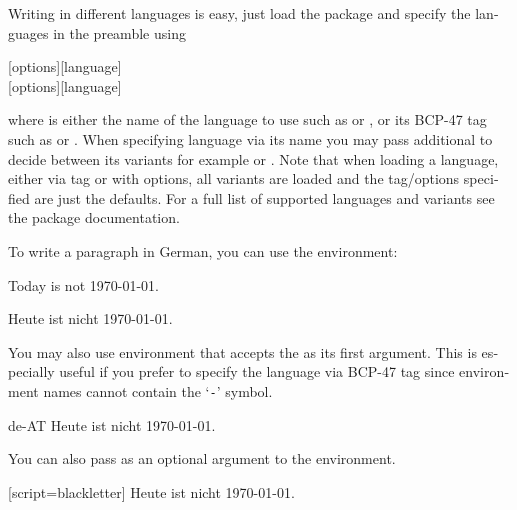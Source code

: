 Writing in different languages is easy, just load the  package
and specify the languages in the preamble using
\begin{lscommand}
  [options][language] \\
  [options][language]
\end{lscommand}
where  is either the name of the language to use such as
 or , or its BCP-47 tag such as  or
. When specifying language via its name you may pass
additional  to decide between its variants for example
 or . Note that when loading a
language, either via tag or with options, all variants are loaded and the
tag\slash options specified are just the defaults. For a full list of supported
languages and variants see the  package documentation.

To write a paragraph in German, you can use the  environment:

\begin{example}
\setdefaultlanguage{english}
Today is not \today.

\begin{german}
  Heute ist nicht \today.
\end{german}
\end{example}

You may also use  environment that accepts the  as its
first argument. This is especially useful if you prefer to specify the language
via BCP-47 tag since environment names cannot contain the
\enquote*{\texttt{-}} symbol.

\begin{example}
\begin{lang}{de-AT}
  Heute ist nicht \today.
\end{lang}
\end{example}

You can also pass  as an optional argument to the environment.

\begin{example}
\begin{german}[script=blackletter]
  Heute ist nicht \today.
\end{german}
\end{example}


